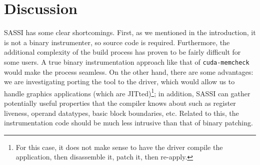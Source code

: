 \section{Discussion}

SASSI has some clear shortcomings.  First, as we mentioned in the
introduction, it is not a binary instrumenter, so source code is
required.  Furthermore, the additional complexity of the build process
has proven to be fairly difficult for some users.  A true binary
instrumentation approach like that of \texttt{cuda-memcheck} would
make the process seamless.  On the other hand, there are some
advantages: we are investigating porting the tool to the driver, which
would allow us to handle graphics applications (which are
JITted)\footnote{For this case, it does not make sense to have the
  driver compile the application, then disassemble it, patch it, then
  re-apply.}; in
addition, SASSI can gather potentially useful properties that the
compiler knows about such as register liveness, operand datatypes,
basic block boundaries, etc.  Related to this, the instrumentation
code should be much less intrusive than that of binary patching.
